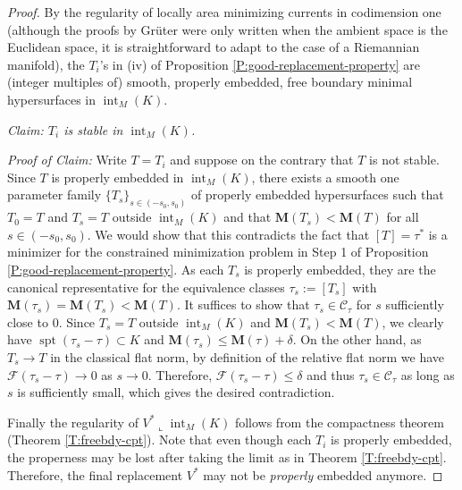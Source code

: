 \documentclass[10pt]{amsart}
\theoremstyle{definition}
\theoremstyle{remark}
\numberwithin{equation}{section}
\newcommand{\F}{\mathcal{F}}
\newcommand{\C}{\mathcal{C}}
\newcommand{\lc}{\llcorner}
\newcommand{\M}{\mathbf{M}}
\newcommand{\spt}{\operatorname{spt}}
\newcommand{\interior}{\operatorname{int}}
\begin{document}
\begin{proof}
By the regularity of locally area minimizing currents in codimension one \cite[Theorem 4.7]{Gr87} (although the proofs by Gr\"uter were only written when the ambient space is the Euclidean space, it is straightforward to adapt to the case of a Riemannian manifold), the $T_i$'s in (iv) of Proposition \ref{P:good-replacement-property} are (integer multiples of) smooth, properly embedded, free boundary minimal hypersurfaces in $\interior_M(K)$. 

\vspace{0.3cm}
\textit{Claim: $T_i$ is stable in $\interior_M(K)$.}

\textit{Proof of Claim:} Write $T=T_i$ and suppose on the contrary that $T$ is not stable. Since $T$ is properly embedded in $\interior_M(K)$, there exists a smooth one parameter family $\{T_s\}_{s \in (-s_0,s_0)}$ of properly embedded hypersurfaces such that $T_0=T$ and $T_s=T$ outside $\interior_M(K)$ and that $\M(T_s) < \M(T)$ for all $s \in (-s_0,s_0)$. We would show that this contradicts the fact that $[T]=\tau^*$ is a minimizer for the constrained minimization problem in Step 1 of Proposition \ref{P:good-replacement-property}. As each $T_s$ is properly embedded, they are the canonical representative for the equivalence classes $\tau_s:=[T_s]$ with $\M(\tau_s)=\M(T_s)<\M(T)$. It suffices to show that $\tau_s \in \C_\tau$ for $s$ sufficiently close to $0$. Since $T_s=T$ outside $\interior_M(K)$ and $\M(T_s)<\M(T)$, we clearly have $
\spt(\tau_s-\tau) \subset K$ and $\M(\tau_s) \leq \M(\tau)+\delta$. On the other hand, as $T_s \to T$ in the classical flat norm, by definition of the relative flat norm we have $\F(\tau_s -\tau) \to 0$ as $s \to 0$. Therefore, $\F(\tau_s -\tau) \leq \delta$ and thus $\tau_s \in \C_\tau$ as long as $s$ is sufficiently small, which gives the desired contradiction.

\vspace{0.3cm}
Finally the regularity of $V^*\lc \interior_M(K)$ follows from the compactness theorem (Theorem \ref{T:freebdy-cpt}). Note that even though each $T_i$ is properly embedded, the properness may be lost after taking the limit as in Theorem \ref{T:freebdy-cpt}. Therefore, the final replacement $V^*$ may not be \emph{properly} embedded anymore.
\end{proof}
\end{document}
